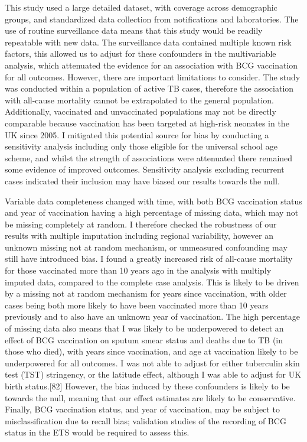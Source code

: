 \documentclass[11pt,twoside]{bristolthesis}
\begin{document}
  This study used a large detailed dataset, with coverage across demographic groups, and standardized data collection from notifications and laboratories. The use of routine surveillance data means that this study would be readily repeatable with new data. The surveillance data contained multiple known risk factors, this allowed us to adjust for these confounders in the multivariable analysis, which attenuated the evidence for an association with BCG vaccination for all outcomes. However, there are important limitations to consider. The study was conducted within a population of active TB cases, therefore the association with all-cause mortality cannot be extrapolated to the general population. Additionally, vaccinated and unvaccinated populations may not be directly comparable because vaccination has been targeted at high-risk neonates in the UK since 2005. I mitigated this potential source for bias by conducting a sensitivity analysis including only those eligible for the universal school age scheme, and whilst the strength of associations were attenuated there remained some evidence of improved outcomes. Sensitivity analysis excluding recurrent cases indicated their inclusion may have biased our results towards the null.
  
  Variable data completeness changed with time, with both BCG vaccination status and year of vaccination having a high percentage of missing data, which may not be missing completely at random. I therefore checked the robustness of our results with multiple imputation including regional variability, however an unknown missing not at random mechanism, or unmeasured confounding may still have introduced bias. I found a greatly increased risk of all-cause mortality for those vaccinated more than 10 years ago in the analysis with multiply imputed data, compared to the complete case analysis. This is likely to be driven by a missing not at random mechanism for years since vaccination, with older cases being both more likely to have been vaccinated more than 10 years previously and to also have an unknown year of vaccination. The high percentage of missing data also means that I was likely to be underpowered to detect an effect of BCG vaccination on sputum smear status and deaths due to TB (in those who died), with years since vaccination, and age at vaccination likely to be underpowered for all outcomes. I was not able to adjust for either tuberculin skin test (TST) stringency, or the latitude effect, although I was able to adjust for UK birth status.{[}82{]} However, the bias induced by these confounders is likely to be towards the null, meaning that our effect estimates are likely to be conservative. Finally, BCG vaccination status, and year of vaccination, may be subject to misclassification due to recall bias; validation studies of the recording of BCG status in the ETS would be required to assess this.
  
\end{document}
